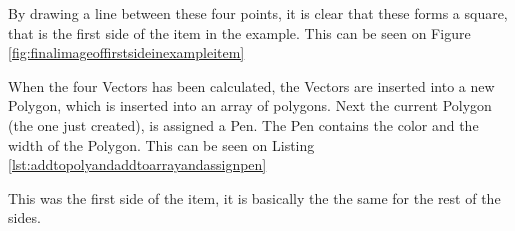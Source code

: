 By drawing a line between these four points, it is clear that these forms a square, that is the first side of the item in the example. This can be seen on Figure \ref{fig:finalimageoffirstsideinexampleitem}

When the four Vectors has been calculated, the Vectors are inserted into a new Polygon, which is inserted into an array of polygons.  Next the current Polygon (the one just created), is assigned a Pen. The Pen contains the color and the width of the Polygon. This can be seen on Listing \ref{lst:addtopolyandaddtoarrayandassignpen}


This was the first side of the item, it is basically the the same for the rest of the sides. 


